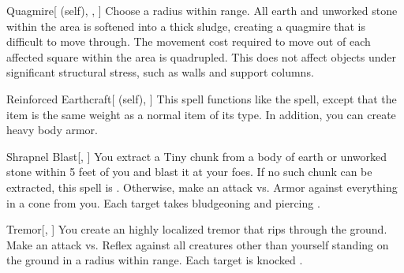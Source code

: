 \lowercase{\hypertarget{spell:Quagmire}{}}\label{spell:Quagmire}
\begin{ability}[\nth{2}]{\hypertarget{spell:Quagmire}{Quagmire}}[ (self), , ]
Choose a \areamed radius within \rngmed range.
All earth and unworked stone within the area is softened into a thick sludge, creating a quagmire that is difficult to move through.
The movement cost required to move out of each affected square within the area is quadrupled.
This does not affect objects under significant structural stress, such as walls and support columns.
\end{ability}
\vspace{0.25em}



\lowercase{\hypertarget{spell:Reinforced Earthcraft}{}}\label{spell:Reinforced Earthcraft}
\begin{ability}[\nth{2}]{\hypertarget{spell:Reinforced Earthcraft}{Reinforced Earthcraft}}[ (self), ]
This spell functions like the  spell, except that the item is the same weight as a normal item of its type.
In addition, you can create heavy body armor.
\end{ability}
\vspace{0.25em}



\lowercase{\hypertarget{spell:Shrapnel Blast}{}}\label{spell:Shrapnel Blast}
\begin{ability}[\nth{2}]{\hypertarget{spell:Shrapnel Blast}{Shrapnel Blast}}[, ]
You extract a Tiny chunk from a body of earth or unworked stone within 5 feet of you and blast it at your foes.
If no such chunk can be extracted, this spell is .
Otherwise, make an attack vs. Armor against everything in a \arealarge cone from you.
\hit Each target takes bludgeoning and piercing .
\end{ability}
\vspace{0.25em}



\lowercase{\hypertarget{spell:Tremor}{}}\label{spell:Tremor}
\begin{ability}[\nth{2}]{\hypertarget{spell:Tremor}{Tremor}}[, ]
You create an highly localized tremor that rips through the ground.
Make an attack vs. Reflex against all creatures other than yourself standing on the ground in a \areamed radius within \rngmed range.
\hit Each target is knocked .
\end{ability}
\vspace{0.25em}



